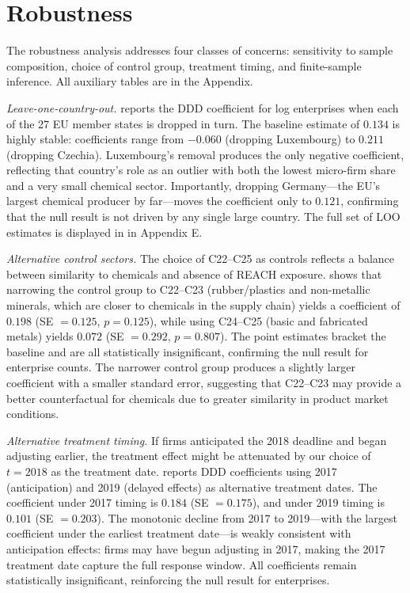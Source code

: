 \documentclass[12pt]{article}
\begin{document}
\section{Robustness}
\label{sec:robustness}

The robustness analysis addresses four classes of concerns: sensitivity to sample composition, choice of control group, treatment timing, and finite-sample inference. All auxiliary tables are in the Appendix.

\textit{Leave-one-country-out.}  reports the DDD coefficient for log enterprises when each of the 27 EU member states is dropped in turn. The baseline estimate of $0.134$ is highly stable: coefficients range from $-0.060$ (dropping Luxembourg) to $0.211$ (dropping Czechia). Luxembourg's removal produces the only negative coefficient, reflecting that country's role as an outlier with both the lowest micro-firm share and a very small chemical sector. Importantly, dropping Germany---the EU's largest chemical producer by far---moves the coefficient only to $0.121$, confirming that the null result is not driven by any single large country. The full set of LOO estimates is displayed in  in Appendix E.

\textit{Alternative control sectors.} The choice of C22--C25 as controls reflects a balance between similarity to chemicals and absence of REACH exposure.  shows that narrowing the control group to C22--C23 (rubber/plastics and non-metallic minerals, which are closer to chemicals in the supply chain) yields a coefficient of $0.198$ (SE $= 0.125$, $p = 0.125$), while using C24--C25 (basic and fabricated metals) yields $0.072$ (SE $= 0.292$, $p = 0.807$). The point estimates bracket the baseline and are all statistically insignificant, confirming the null result for enterprise counts. The narrower control group produces a slightly larger coefficient with a smaller standard error, suggesting that C22--C23 may provide a better counterfactual for chemicals due to greater similarity in product market conditions.

\textit{Alternative treatment timing.} If firms anticipated the 2018 deadline and began adjusting earlier, the treatment effect might be attenuated by our choice of $t = 2018$ as the treatment date.  reports DDD coefficients using 2017 (anticipation) and 2019 (delayed effects) as alternative treatment dates. The coefficient under 2017 timing is $0.184$ (SE $= 0.175$), and under 2019 timing is $0.101$ (SE $= 0.203$). The monotonic decline from 2017 to 2019---with the largest coefficient under the earliest treatment date---is weakly consistent with anticipation effects: firms may have begun adjusting in 2017, making the 2017 treatment date capture the full response window. All coefficients remain statistically insignificant, reinforcing the null result for enterprises.
\end{document}
